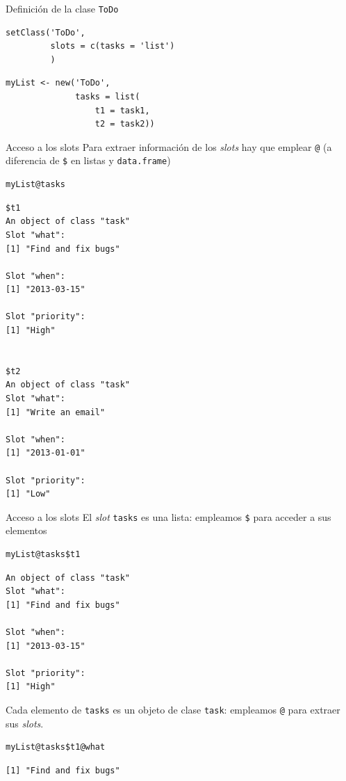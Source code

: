 \documentclass[xcolor={usenames,svgnames,dvipsnames}]{beamer}
\begin{document}
\begin{frame}[fragile,label={sec:orgheadline25}]{Definición de la clase \texttt{ToDo}}
 \lstset{language=R,label= ,caption= ,captionpos=b,numbers=none}
\begin{lstlisting}
setClass('ToDo',
         slots = c(tasks = 'list')
         )
\end{lstlisting}

\lstset{language=R,label= ,caption= ,captionpos=b,numbers=none}
\begin{lstlisting}
myList <- new('ToDo',
              tasks = list(
                  t1 = task1,
                  t2 = task2))
\end{lstlisting}
\end{frame}

\begin{frame}[fragile,label={sec:orgheadline26}]{Acceso a los slots}
 Para extraer información de los \emph{slots} hay que emplear \texttt{@} (a
diferencia de \texttt{\$} en listas y \texttt{data.frame})
\lstset{language=R,label= ,caption= ,captionpos=b,numbers=none}
\begin{lstlisting}
myList@tasks
\end{lstlisting}

\begin{verbatim}
$t1
An object of class "task"
Slot "what":
[1] "Find and fix bugs"

Slot "when":
[1] "2013-03-15"

Slot "priority":
[1] "High"


$t2
An object of class "task"
Slot "what":
[1] "Write an email"

Slot "when":
[1] "2013-01-01"

Slot "priority":
[1] "Low"
\end{verbatim}
\end{frame}

\begin{frame}[fragile,label={sec:orgheadline27}]{Acceso a los slots}
 El \emph{slot} \texttt{tasks} es una lista: empleamos \texttt{\$} para acceder a sus elementos
\lstset{language=R,label= ,caption= ,captionpos=b,numbers=none}
\begin{lstlisting}
myList@tasks$t1
\end{lstlisting}

\begin{verbatim}
An object of class "task"
Slot "what":
[1] "Find and fix bugs"

Slot "when":
[1] "2013-03-15"

Slot "priority":
[1] "High"
\end{verbatim}

Cada elemento de \texttt{tasks} es un objeto de clase \texttt{task}: empleamos
\texttt{@} para extraer sus \emph{slots}.
\lstset{language=R,label= ,caption= ,captionpos=b,numbers=none}
\begin{lstlisting}
myList@tasks$t1@what
\end{lstlisting}

\begin{verbatim}
[1] "Find and fix bugs"
\end{verbatim}
\end{frame}
\end{document}
